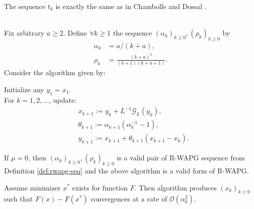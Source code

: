 \documentclass[12pt]{article}
\begin{document}
    \begin{remark}
        The sequence $t_k$ is exactly the same as in Chambolle and Dossal 
        \cite[Theorem 3.1]{chambolle_convergence_2015}.
    \end{remark}
    \begin{theorem}\label{thm:r-wapg-on-cham-doss}\;\\
        Fix arbitrary $a \ge 2$.
        Define $\forall k \ge 1$ the sequence $(\alpha_k)_{k \ge 0}, (\rho_k)_{k \ge 0}$ by
        \begin{align*}
            \alpha_k &= a/(k + a),
            \\
            \rho_k &= \frac{(k + a)^2}{(k + 1)(k + a + 1)}.
        \end{align*}
        Consider the algorithm given by:
        \begin{tcolorbox}
            Initialize any $y_1 = x_1$.
            \\
            For $k = 1, 2, \ldots$, update:
            \begin{align*}
                & x_{k + 1} := y_k + L^{-1}\mathcal G_L(y_k),
                \\
                & \theta_{k + 1} := \alpha_{k + 1}(\alpha_k^{-1} - 1),
                \\
                & y_{k + 1} := x_{k + 1} + \theta_{k + 1}(x_{k + 1} - x_k).
            \end{align*}
        \end{tcolorbox}
        If $\mu = 0$, then $(\alpha_k)_{k \ge 0}, (\rho_k)_{k \ge 0}$ is a valid pair of R-WAPG sequence from Definition \ref{def:rwapg-seq} and the above algorithm is a valid form of R-WAPG.
        \par
        Assume minimizer $x^*$ exists for function $F$.
        Then algorithm produces $(x_k)_{k \ge0}$ such that $F(x) - F(x^*)$ convergences at a rate of $\mathcal O(\alpha_k^2)$.
    \end{theorem}
\end{document}
